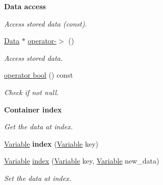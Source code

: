\begin{Indent}{\bf Data access}
\begin{DoxyCompactItemize}
\begin{DoxyCompactList}\small\item\em Access stored data (const). \end{DoxyCompactList}\item 
\hyperlink{classcreek_1_1_data}{Data} $\ast$ \hyperlink{classcreek_1_1_variable_a6591101adff7938ff5b26238afb3373b}{operator-\/$>$} ()\hypertarget{classcreek_1_1_variable_a6591101adff7938ff5b26238afb3373b}{}\label{classcreek_1_1_variable_a6591101adff7938ff5b26238afb3373b}

\begin{DoxyCompactList}\small\item\em Access stored data. \end{DoxyCompactList}\item 
\hyperlink{classcreek_1_1_variable_a3b3111c19d230506d41a4e2885319dca}{operator bool} () const \hypertarget{classcreek_1_1_variable_a3b3111c19d230506d41a4e2885319dca}{}\label{classcreek_1_1_variable_a3b3111c19d230506d41a4e2885319dca}

\begin{DoxyCompactList}\small\item\em Check if not null. \end{DoxyCompactList}\end{DoxyCompactItemize}
\end{Indent}
\begin{Indent}{\bf Container index}\par
{\em Get the data at index. }\begin{DoxyCompactItemize}
\item 
\hyperlink{classcreek_1_1_variable}{Variable} {\bfseries index} (\hyperlink{classcreek_1_1_variable}{Variable} key)\hypertarget{classcreek_1_1_variable_a698e1796a555d9c271f516a405fc38f1}{}\label{classcreek_1_1_variable_a698e1796a555d9c271f516a405fc38f1}

\item 
\hyperlink{classcreek_1_1_variable}{Variable} \hyperlink{classcreek_1_1_variable_a0c89f0d0214f9937dd43743922a9890d}{index} (\hyperlink{classcreek_1_1_variable}{Variable} key, \hyperlink{classcreek_1_1_variable}{Variable} new\+\_\+data)\hypertarget{classcreek_1_1_variable_a0c89f0d0214f9937dd43743922a9890d}{}\label{classcreek_1_1_variable_a0c89f0d0214f9937dd43743922a9890d}

\begin{DoxyCompactList}\small\item\em Set the data at index. \end{DoxyCompactList}\end{DoxyCompactItemize}
\end{Indent}

